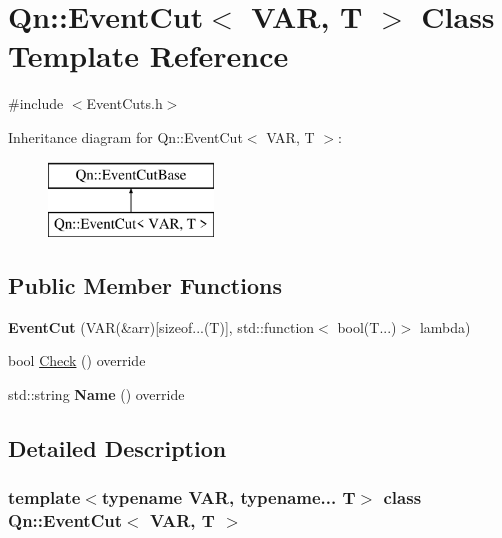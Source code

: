 \hypertarget{classQn_1_1EventCut}{}\section{Qn\+:\+:Event\+Cut$<$ V\+AR, T $>$ Class Template Reference}
\label{classQn_1_1EventCut}


{\ttfamily \#include $<$Event\+Cuts.\+h$>$}

Inheritance diagram for Qn\+:\+:Event\+Cut$<$ V\+AR, T $>$\+:\begin{figure}[H]
\begin{center}
\leavevmode
\includegraphics[height=2.000000cm]{classQn_1_1EventCut}
\end{center}
\end{figure}
\subsection*{Public Member Functions}
\begin{DoxyCompactItemize}
\item 
\mbox{\label{classQn_1_1EventCut_a09f20d8a667327a23148d8488ea35dcd}} 
{\bfseries Event\+Cut} (V\+AR(\&arr)\mbox{[}sizeof...(T)\mbox{]}, std\+::function$<$ bool(T...)$>$ lambda)
\item 
bool \mbox{\hyperlink{classQn_1_1EventCut_ab559f2c200401108566c1641773d778e}{Check}} () override
\item 
\mbox{\label{classQn_1_1EventCut_a4cfeb68f1bed74e602b98df2a9ddd414}} 
std\+::string {\bfseries Name} () override
\end{DoxyCompactItemize}


\subsection{Detailed Description}
\subsubsection*{template$<$typename V\+AR, typename... T$>$\newline
class Qn\+::\+Event\+Cut$<$ V\+A\+R, T $>$}

